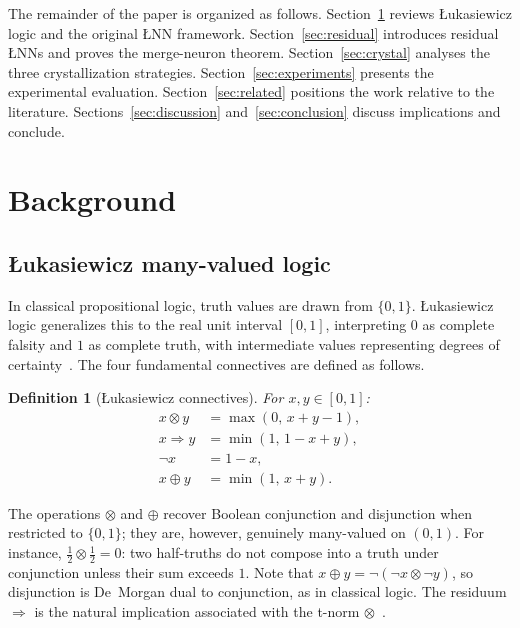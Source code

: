 \documentclass[12pt,a4paper]{article}
\newtheorem{definition}[theorem]{Definition}
\newcommand{\tnorm}{\otimes}      %
\newcommand{\resid}{\Rightarrow}  %
\newcommand{\disj}{\oplus}        %
\newcommand{\LNN}{\L{}NN}
\begin{document}
The remainder of the paper is organized as follows.
Section~\ref{sec:background} reviews \L{}ukasiewicz logic and the original
\LNN{} framework.
Section~\ref{sec:residual} introduces residual \LNN{}s and proves the merge-neuron
theorem.
Section~\ref{sec:crystal} analyses the three crystallization strategies.
Section~\ref{sec:experiments} presents the experimental evaluation.
Section~\ref{sec:related} positions the work relative to the literature.
Sections~\ref{sec:discussion} and~\ref{sec:conclusion} discuss implications and
conclude.

\section{Background}
\label{sec:background}

\subsection{\L{}ukasiewicz many-valued logic}
\label{ssec:logic}

In classical propositional logic, truth values are drawn from $\{0,1\}$.
\L{}ukasiewicz logic generalizes this to the real unit interval $[0,1]$,
interpreting $0$ as complete falsity and $1$ as complete truth, with
intermediate values representing degrees of certainty~\cite{hajek1998}.
The four fundamental connectives are defined as follows.
\begin{definition}[\L{}ukasiewicz connectives]
For $x, y \in [0,1]$:
\begin{align}
  x \tnorm y  &= \max(0,\, x + y - 1),   \label{eq:tnorm}\\
  x \resid y  &= \min(1,\, 1 - x + y),   \label{eq:resid}\\
  \neg x       &= 1 - x,                  \label{eq:neg}\\
  x \disj y   &= \min(1,\, x + y).       \label{eq:disj}
\end{align}
\end{definition}
The operations $\tnorm$ and $\disj$ recover Boolean conjunction and disjunction
when restricted to $\{0,1\}$; they are, however, genuinely many-valued on $(0,1)$.
For instance, $\tfrac{1}{2} \tnorm \tfrac{1}{2} = 0$: two half-truths do not
compose into a truth under conjunction unless their sum exceeds $1$.
Note that $x \disj y = \neg(\neg x \tnorm \neg y)$, so disjunction is
De~Morgan dual to conjunction, as in classical logic.
The residuum $\resid$ is the natural implication associated with the t-norm
$\tnorm$~\cite{hajek1998}.
\end{document}
